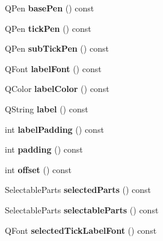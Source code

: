 \begin{DoxyCompactItemize}
Q\+Pen {\bfseries base\+Pen} () const
\item 
\mbox{\label{class_q_c_p_axis_affd022d4f56dfc575b4ced95ad417860}} 
Q\+Pen {\bfseries tick\+Pen} () const
\item 
\mbox{\label{class_q_c_p_axis_a7a89df74ba427fac311bf4cc92fbddca}} 
Q\+Pen {\bfseries sub\+Tick\+Pen} () const
\item 
\mbox{\label{class_q_c_p_axis_aa7b465fe233f1878793954ba5ab9c47e}} 
Q\+Font {\bfseries label\+Font} () const
\item 
\mbox{\label{class_q_c_p_axis_a05794f13d322da7fd9d5554d11186b0e}} 
Q\+Color {\bfseries label\+Color} () const
\item 
\mbox{\label{class_q_c_p_axis_a32ba4d3effcddd8af3bc49f405e1d53e}} 
Q\+String {\bfseries label} () const
\item 
\mbox{\label{class_q_c_p_axis_a6d9a9fe1c7166f209fb1e25686390451}} 
int {\bfseries label\+Padding} () const
\item 
\mbox{\label{class_q_c_p_axis_a07df379d5c017b8f3a4702532eb037b2}} 
int {\bfseries padding} () const
\item 
\mbox{\label{class_q_c_p_axis_aef66fa16353b4993b1cceabfb644a1a9}} 
int {\bfseries offset} () const
\item 
\mbox{\label{class_q_c_p_axis_a893e8d6cfed9267eb2b793cb1d2b4dce}} 
Selectable\+Parts {\bfseries selected\+Parts} () const
\item 
\mbox{\label{class_q_c_p_axis_a1d12d157756c114f4e57517c62177181}} 
Selectable\+Parts {\bfseries selectable\+Parts} () const
\item 
\mbox{\label{class_q_c_p_axis_a09817512bef8ddfb669a6828f9c855bc}} 
Q\+Font {\bfseries selected\+Tick\+Label\+Font} () const
\item 
\mbox{\label{class_q_c_p_axis_a1399d614f7c307159bfec938a069203d}} 

\end{DoxyCompactItemize}
